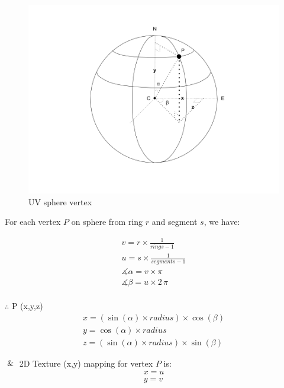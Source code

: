 \begin{figure}[H]
\caption[uv-sphere-vertex]{UV sphere vertex}
\label{fig:uv-sphere-vertex}
\centering
\includegraphics[width=\linewidth]{Figures/uv-sphere-vertex.png}
\decoRule
\end{figure}

For each vertex $P$ on sphere from ring $r$ and segment $s$, we have:

\[
\begin{array}{lr}
v = r \times  \frac{1}{rings - 1} \\
u = s \times  \frac{1}{segments - 1} \\
\measuredangle \alpha = v \times \pi \\
\measuredangle \beta = u \times 2\,\pi \\
\end{array}
\]

$\therefore$ P (x,\;y,\;z)
\[
\begin{array}{lr}
x = (\sin(\alpha) \times radius) \times \cos(\beta) \\
y = \cos(\alpha) \times radius \\
z =  (\sin(\alpha) \times radius) \times \sin(\beta)
\end{array}
\]

$\And$ 2D Texture (x,\;y) mapping for vertex $P$ is:
\[
\begin{array}{lr}
x = u \\
y = v \\
\end{array}
\]

